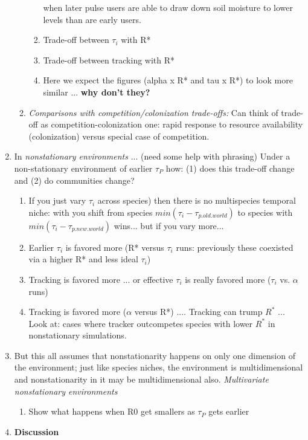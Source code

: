 \documentclass[11pt,letterpaper]{article}
\begin{document}
\begin{enumerate}
\begin{enumerate}
\begin{enumerate}
when later pulse users are able to draw down soil moisture to lower levels than are early users.
\item Trade-off between $\tau_i$ with R*
\item Trade-off between tracking with R*
\item Here we expect the figures (alpha x R* and tau x R*) to look more similar ... {\bf why don't they?}
\end{enumerate}
\item \emph{Comparisons with competition/colonization trade-offs:} Can think of trade-off as competition-colonization one: rapid response to resource availability (colonization) versus special case of competition.\\
\end{enumerate}
\item In \emph{nonstationary environments} ... (need some help with phrasing)
Under a non-stationary environment of earlier $\tau_P$ how: (1) does this trade-off change and (2) do communities change?
\begin{enumerate}
\item If you just vary $\tau_i$ across species) then there is no multispecies temporal niche: with you shift from species $min(\tau_i - \tau_{p.old.world})$ to species with $min(\tau_i - \tau_{p.new.world})$ wins... but if you vary more...
\item Earlier $\tau_i$ is favored more (R* versus $\tau_i$ runs: previously these coexisted via a higher R* and less ideal $\tau_i$)
\item Tracking is favored more ... or effective $\tau_i$ is really favored more ($\tau_i$ vs. $\alpha$ runs)
\item Tracking is favored more ($\alpha$ versus R*)  .... Tracking can trump $R^*$ ... Look at: cases where tracker outcompetes species with lower $R^*$ in nonstationary simulations.
\end{enumerate}
\item But this all assumes that nonstationarity happens on only one dimension of the environment; just like species niches, the environment is multidimensional and nonstationarity in it may be multidimensional also. \emph{Multivariate nonstationary environments}
\begin{enumerate}
\item Show what happens when R0 get smallers as $\tau_{P}$ gets earlier
\end{enumerate}
\item {\bf Discussion}
\begin{enumerate}

\end{enumerate}
\end{enumerate}
\end{document}
